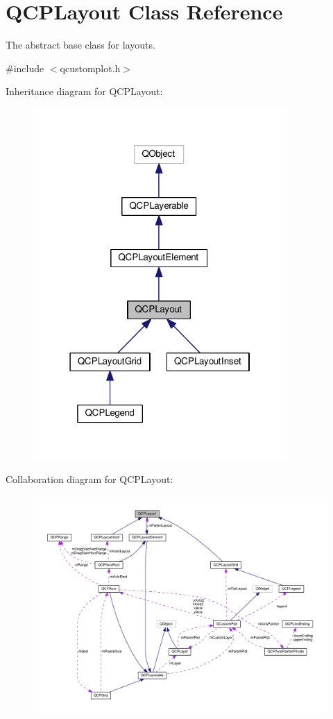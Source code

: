 \hypertarget{classQCPLayout}{}\section{Q\+C\+P\+Layout Class Reference}
\label{classQCPLayout}


The abstract base class for layouts.  




{\ttfamily \#include $<$qcustomplot.\+h$>$}



Inheritance diagram for Q\+C\+P\+Layout\+:\nopagebreak
\begin{figure}[H]
\begin{center}
\leavevmode
\includegraphics[width=274pt]{classQCPLayout__inherit__graph}
\end{center}
\end{figure}


Collaboration diagram for Q\+C\+P\+Layout\+:\nopagebreak
\begin{figure}[H]
\begin{center}
\leavevmode
\includegraphics[width=350pt]{classQCPLayout__coll__graph}
\end{center}
\end{figure}
